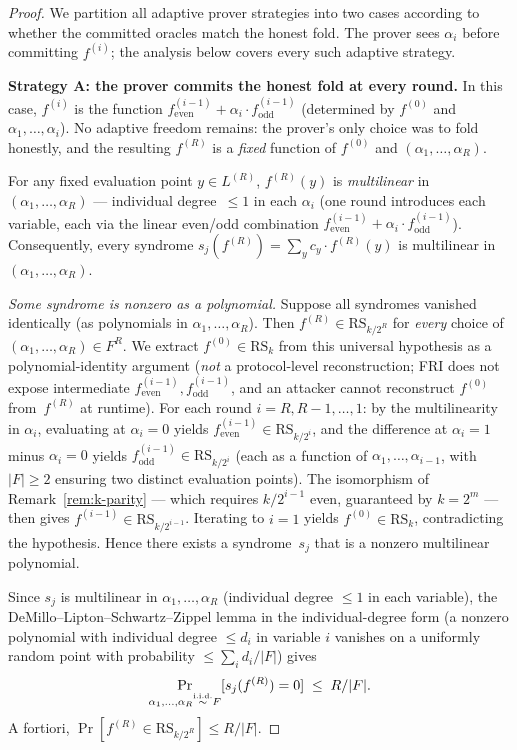 \documentclass[11pt]{article}
\newcommand{\RS}{\mathrm{RS}}
\begin{document}
\begin{proof}
We partition all adaptive prover strategies into two cases according to whether the committed oracles match the honest fold. The prover sees $\alpha_i$ before committing $f^{(i)}$; the analysis below covers every such adaptive strategy.

\textbf{Strategy A: the prover commits the honest fold at every round.} In this case, $f^{(i)}$ is the function $f^{(i-1)}_{\mathrm{even}} + \alpha_i \cdot f^{(i-1)}_{\mathrm{odd}}$ (determined by $f^{(0)}$ and $\alpha_1, \ldots, \alpha_i$). No adaptive freedom remains: the prover's only choice was to fold honestly, and the resulting $f^{(R)}$ is a \emph{fixed} function of $f^{(0)}$ and $(\alpha_1, \ldots, \alpha_R)$.

For any fixed evaluation point $y \in L^{(R)}$, $f^{(R)}(y)$ is \emph{multilinear} in $(\alpha_1, \ldots, \alpha_R)$ --- individual degree~$\leq 1$ in each $\alpha_i$ (one round introduces each variable, each via the linear even/odd combination $f^{(i-1)}_{\mathrm{even}} + \alpha_i \cdot f^{(i-1)}_{\mathrm{odd}}$).  Consequently, every syndrome $s_j(f^{(R)}) = \sum_y c_y \cdot f^{(R)}(y)$ is multilinear in $(\alpha_1, \ldots, \alpha_R)$.

\emph{Some syndrome is nonzero as a polynomial.} Suppose all syndromes vanished identically (as polynomials in $\alpha_1, \ldots, \alpha_R$). Then $f^{(R)} \in \RS_{k/2^R}$ for \emph{every} choice of $(\alpha_1, \ldots, \alpha_R) \in F^R$. We extract $f^{(0)} \in \RS_k$ from this universal hypothesis as a polynomial-identity argument (\emph{not} a protocol-level reconstruction; FRI does not expose intermediate $f^{(i-1)}_{\mathrm{even}}, f^{(i-1)}_{\mathrm{odd}}$, and an attacker cannot reconstruct $f^{(0)}$ from~$f^{(R)}$ at runtime). For each round $i = R, R{-}1, \ldots, 1$: by the multilinearity in $\alpha_i$, evaluating at $\alpha_i = 0$ yields $f^{(i-1)}_{\mathrm{even}} \in \RS_{k/2^i}$, and the difference at $\alpha_i = 1$ minus $\alpha_i = 0$ yields $f^{(i-1)}_{\mathrm{odd}} \in \RS_{k/2^i}$ (each as a function of $\alpha_1, \ldots, \alpha_{i-1}$, with $|F| \geq 2$ ensuring two distinct evaluation points). The isomorphism of Remark~\ref{rem:k-parity} --- which requires $k/2^{i-1}$ even, guaranteed by $k = 2^m$ --- then gives $f^{(i-1)} \in \RS_{k/2^{i-1}}$. Iterating to $i=1$ yields $f^{(0)} \in \RS_k$, contradicting the hypothesis. Hence there exists a syndrome~$s_j$ that is a nonzero multilinear polynomial.

Since $s_j$ is multilinear in $\alpha_1, \ldots, \alpha_R$ (individual degree $\leq 1$ in each variable), the DeMillo--Lipton--Schwartz--Zippel lemma in the individual-degree form (a nonzero polynomial with individual degree $\leq d_i$ in variable $i$ vanishes on a uniformly random point with probability $\leq \sum_i d_i / |F|$) gives
$$\Pr_{\alpha_1, \ldots, \alpha_R \stackrel{\textup{i.i.d.}}{\sim} F}[s_j(f^{(R)}) = 0] \;\leq\; R/|F|.$$
A fortiori, $\Pr[f^{(R)} \in \RS_{k/2^R}] \leq R/|F|$.


\end{proof}
\end{document}
